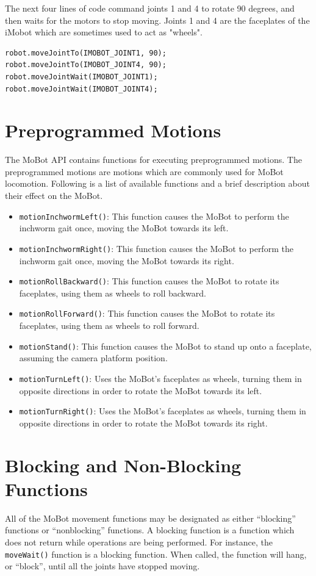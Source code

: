 \documentclass{article}
\begin{document}
The next four lines of code command joints 1 and 4 to rotate 90 degrees, and
then waits for the motors to stop moving. Joints 1 and 4 are the faceplates
of the iMobot which are sometimes used to act as "wheels".
\begin{verbatim}
robot.moveJointTo(IMOBOT_JOINT1, 90);
robot.moveJointTo(IMOBOT_JOINT4, 90);
robot.moveJointWait(IMOBOT_JOINT1);
robot.moveJointWait(IMOBOT_JOINT4);
\end{verbatim}

\section{Preprogrammed Motions}
The MoBot API contains functions for executing preprogrammed motions. The 
preprogrammed motions are motions which are commonly used for MoBot locomotion.
Following is a list of available functions and a brief description about
their effect on the MoBot.
\begin{itemize}
\item \texttt{motionInchwormLeft()}: This function causes the MoBot to perform
  the inchworm gait once, moving the MoBot towards its left.
\item \texttt{motionInchwormRight()}: This function causes the MoBot to perform
  the inchworm gait once, moving the MoBot towards its right.
\item \texttt{motionRollBackward()}: This function causes the MoBot to rotate
  its faceplates, using them as wheels to roll backward.
\item \texttt{motionRollForward()}: This function causes the MoBot to rotate
  its faceplates, using them as wheels to roll forward.
\item \texttt{motionStand()}: This function causes the MoBot to stand up onto a 
  faceplate, assuming the camera platform position.
\item \texttt{motionTurnLeft()}: Uses the MoBot's faceplates as wheels, turning
  them in opposite directions in order to rotate the MoBot towards its left.
\item \texttt{motionTurnRight()}: Uses the MoBot's faceplates as wheels, turning
  them in opposite directions in order to rotate the MoBot towards its right.
\end{itemize}

\section{Blocking and Non-Blocking Functions}
All of the MoBot movement functions may be designated as either ``blocking'' 
functions or ``nonblocking'' functions. A blocking function is a function which
does not return while operations are being performed. For instance, the
\texttt{moveWait()} function is a blocking function. When called, the function
will hang, or ``block'', until all the joints have stopped moving.
\end{document}

